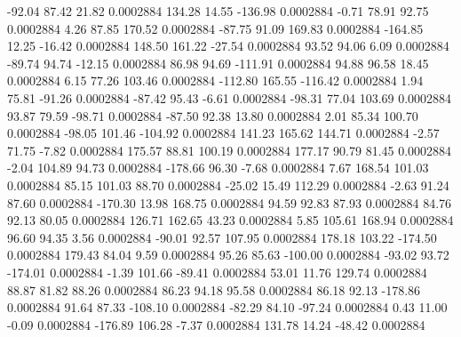       -92.04       87.42       21.82     0.0002884
      134.28       14.55     -136.98     0.0002884
       -0.71       78.91       92.75     0.0002884
        4.26       87.85      170.52     0.0002884
      -87.75       91.09      169.83     0.0002884
     -164.85       12.25      -16.42     0.0002884
      148.50      161.22      -27.54     0.0002884
       93.52       94.06        6.09     0.0002884
      -89.74       94.74      -12.15     0.0002884
       86.98       94.69     -111.91     0.0002884
       94.88       96.58       18.45     0.0002884
        6.15       77.26      103.46     0.0002884
     -112.80      165.55     -116.42     0.0002884
        1.94       75.81      -91.26     0.0002884
      -87.42       95.43       -6.61     0.0002884
      -98.31       77.04      103.69     0.0002884
       93.87       79.59      -98.71     0.0002884
      -87.50       92.38       13.80     0.0002884
        2.01       85.34      100.70     0.0002884
      -98.05      101.46     -104.92     0.0002884
      141.23      165.62      144.71     0.0002884
       -2.57       71.75       -7.82     0.0002884
      175.57       88.81      100.19     0.0002884
      177.17       90.79       81.45     0.0002884
       -2.04      104.89       94.73     0.0002884
     -178.66       96.30       -7.68     0.0002884
        7.67      168.54      101.03     0.0002884
       85.15      101.03       88.70     0.0002884
      -25.02       15.49      112.29     0.0002884
       -2.63       91.24       87.60     0.0002884
     -170.30       13.98      168.75     0.0002884
       94.59       92.83       87.93     0.0002884
       84.76       92.13       80.05     0.0002884
      126.71      162.65       43.23     0.0002884
        5.85      105.61      168.94     0.0002884
       96.60       94.35        3.56     0.0002884
      -90.01       92.57      107.95     0.0002884
      178.18      103.22     -174.50     0.0002884
      179.43       84.04        9.59     0.0002884
       95.26       85.63     -100.00     0.0002884
      -93.02       93.72     -174.01     0.0002884
       -1.39      101.66      -89.41     0.0002884
       53.01       11.76      129.74     0.0002884
       88.87       81.82       88.26     0.0002884
       86.23       94.18       95.58     0.0002884
       86.18       92.13     -178.86     0.0002884
       91.64       87.33     -108.10     0.0002884
      -82.29       84.10      -97.24     0.0002884
        0.43       11.00       -0.09     0.0002884
     -176.89      106.28       -7.37     0.0002884
      131.78       14.24      -48.42     0.0002884
